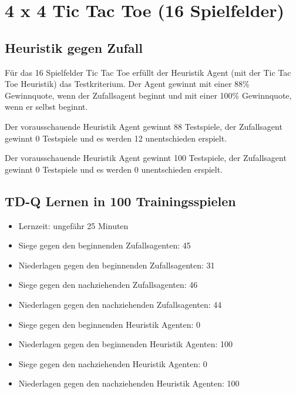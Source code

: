 \section{4 x 4 Tic Tac Toe (16 Spielfelder)}

\subsection{Heuristik gegen Zufall}
Für das 16 Spielfelder Tic Tac Toe erfüllt der Heuristik Agent (mit der Tic Tac Toe Heuristik) das Testkriterium. Der Agent gewinnt mit einer 88\% Gewinnquote, wenn der Zufallsagent beginnt und mit einer 100\% Gewinnquote, wenn er selbst beginnt.

Der vorausschauende Heuristik Agent gewinnt 88 Testspiele, der Zufallsagent gewinnt 0 Testspiele und es werden 12 unentschieden erspielt.

Der vorausschauende Heuristik Agent gewinnt 100 Testspiele, der Zufallsagent gewinnt 0 Testspiele und es werden 0 unentschieden erspielt.

\subsection{TD-Q Lernen in 100 Trainingsspielen}
\begin{itemize}
\item Lernzeit: ungefähr 25 Minuten

\item Siege gegen den beginnenden Zufallsagenten: 45
\item Niederlagen gegen den beginnenden Zufallsagenten: 31 

\item Siege gegen den nachziehenden Zufallsagenten: 46
\item Niederlagen gegen den nachziehenden Zufallsagenten: 44 

\item Siege gegen den beginnenden Heuristik Agenten: 0
\item Niederlagen gegen den beginnenden Heuristik Agenten: 100

\item Siege gegen den nachziehenden Heuristik Agenten: 0
\item Niederlagen gegen den nachziehenden Heuristik Agenten: 100
\end{itemize}


